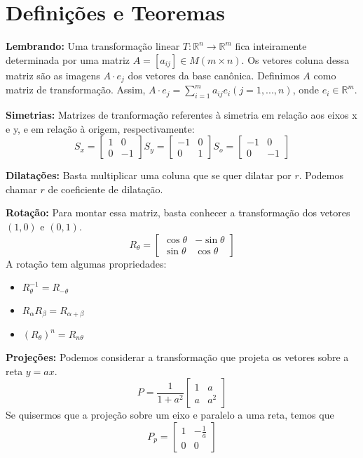 \documentclass[12pt,letterpaper]{article}
\begin{document}
\section*{Definições e Teoremas}
\textbf{Lembrando: } Uma transformação linear $T: \mathbb{R}^n \to \mathbb{R}^m$ fica inteiramente determinada por uma matriz $A = [a_{ij}] \in M(m \times n)$. Os vetores coluna dessa matriz são as imagens $A \cdot e_j$ dos vetores da base canônica. Definimos $A$ como matriz de transformação. Assim, $A \cdot e_j = \sum_{i=1}^m a_{ij}e_i (j=1,...,n)$, onde $e_i \in \mathbb{R}^m$.

\textbf{Simetrias: } Matrizes de tranformação referentes à simetria em relação aos eixos x e y, e em relação à origem, respectivamente:
$$
S_x = \left[
\begin{array}{cc}
1 & 0  \\
0 & -1
\end{array}
\right]
S_y = \left[
\begin{array}{cc}
-1 & 0  \\
0 & 1
\end{array}
\right]
S_o = \left[
\begin{array}{cc}
-1 & 0  \\
0 & -1
\end{array}
\right]
$$

\textbf{Dilatações: } Basta multiplicar uma coluna que se quer dilatar por $r$. Podemos chamar $r$ de coeficiente de dilatação. 

\textbf{Rotação: }Para montar essa matriz, basta conhecer a transformação dos vetores $(1,0)$ e $(0,1)$.
$$
R_{\theta} = \left[
\begin{array}{cc}
\cos \theta & - \sin \theta  \\
\sin \theta & \cos \theta
\end{array}
\right]
$$
A rotação tem algumas propriedades:
\begin{itemize}
    \item $R_{\theta}^{-1} = R_{-\theta}$
    \item $R_{\alpha}R_{\beta} = R_{\alpha + \beta}$
    \item $(R_{\theta})^n = R_{n\theta}$
\end{itemize}

\textbf{Projeções:} Podemos considerar a transformação que projeta os vetores sobre a reta $y = ax$. 
$$
P = \frac{1}{1+a^2} \left[
\begin{array}{cc}
1 & a  \\
a & a^2
\end{array}
\right]
$$
Se quisermos que a projeção sobre um eixo e paralelo a uma reta, temos que
$$
P_p = \left[
\begin{array}{cc}
1 & -\frac{1}{a}  \\
0 & 0
\end{array}
\right]
$$
\end{document}
